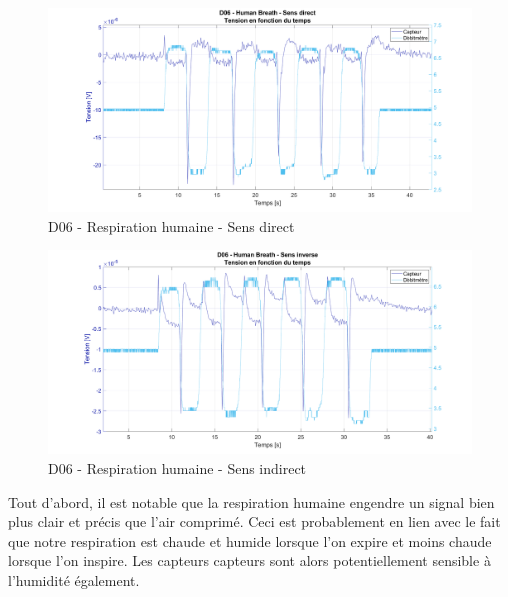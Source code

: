 \begin{figure}[H]
    \centering
    \includegraphics[scale = 0.3]{assets/figures/D06_hb_direct.png}
    \caption{D06 - Respiration humaine - Sens direct}
    \label{fig:d06_hb_direct}
\end{figure}
\begin{figure}[H]
    \centering
    \includegraphics[scale = 0.3]{assets/figures/D06_hb_indirect2.png}
    \caption{D06 - Respiration humaine - Sens indirect}
    \label{fig:d06_hb_indirect}
\end{figure}

Tout d'abord, il est notable que la respiration humaine engendre un signal bien plus clair et précis que l'air comprimé. Ceci est probablement 
en lien avec le fait que notre respiration est chaude et humide lorsque l'on expire et moins chaude lorsque l'on inspire. Les capteurs \gls{capteur}s
sont alors potentiellement sensible à l'humidité également. \\

